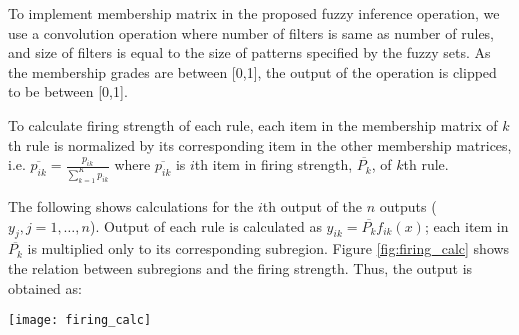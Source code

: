 \documentclass{article}
\begin{document}
To implement membership matrix in the proposed fuzzy inference operation, we use a convolution operation where number of filters is same as number of rules, and size of filters is equal to the size of patterns specified by the fuzzy sets. As the membership grades are between [0,1], the output of the operation is clipped to be between [0,1]. 


To calculate firing strength of each rule, each item in the membership matrix of $k$th rule is normalized by its corresponding item in the other membership matrices, i.e. $\overline{p_{ik}}=\frac{p_{ik}}{\sum_{k=1}^K p_{ik}}$ where $\overline{p_{ik}}$ is $i$th item in firing strength, $\overline{P_k}$, of $k$th rule.


The following shows calculations for the $i$th output of the $n$ outputs ($y_j ,j=1,…,n$). Output of each rule is calculated as  $y_{ik}=\overline{P_k } f_{ik}(x)$; each item in $\overline{P_k }$ is multiplied only to its corresponding subregion. Figure \ref{fig:firing_calc} shows the relation between subregions and the firing strength. Thus, the output is obtained as:

\begin{figure*}[ht]
\vskip 0.2in
\begin{center}
\centerline{\texttt{[image: firing\_calc]}}
\caption{Relation between subregions and the firing strength}
\label{fig:firing_calc}
\end{center}
\vskip -0.2in
\end{figure*}
\end{document}
